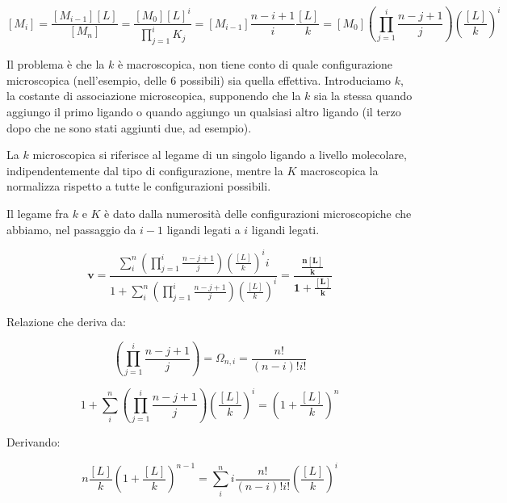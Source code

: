 \[\left\lbrack M_{i} \right\rbrack = \frac{\left\lbrack M_{i - 1} \right\rbrack\left\lbrack L \right\rbrack}{\left\lbrack M_{n} \right\rbrack} = \frac{\left\lbrack M_{0} \right\rbrack\left\lbrack L \right\rbrack^{i}}{\prod_{j = 1}^{i}K_{j}} = \left\lbrack M_{i - 1} \right\rbrack\frac{n - i + 1}{i}\frac{\left\lbrack L \right\rbrack}{k} = \left\lbrack M_{0} \right\rbrack\left( \prod_{j = 1}^{i}\frac{n - j + 1}{j} \right)\left( \frac{\left\lbrack L \right\rbrack}{k} \right)^{i}\ \]

Il problema è che la \(k\) è macroscopica, non tiene conto di quale
configurazione microscopica (nell'esempio, delle 6 possibili) sia quella
effettiva. Introduciamo \(k\), la costante di associazione microscopica,
supponendo che la \(k\) sia la stessa quando aggiungo il primo ligando o
quando aggiungo un qualsiasi altro ligando (il terzo dopo che ne sono
stati aggiunti due, ad esempio).

La \(k\) microscopica si riferisce al legame di un singolo ligando a
livello molecolare, indipendentemente dal tipo di configurazione, mentre
la \(K\) macroscopica la normalizza rispetto a tutte le configurazioni
possibili.

Il legame fra \(k\) e \(K\) è dato dalla numerosità delle configurazioni
microscopiche che abbiamo, nel passaggio da \(i - 1\) ligandi legati a
\(i\) ligandi legati.

\[\mathbf{v} = \frac{\sum_{i}^{n}{\left( \prod_{j = 1}^{i}\frac{n - j + 1}{j} \right)\left( \frac{\left\lbrack L \right\rbrack}{k} \right)^{i}i}}{1 + \sum_{i}^{n}{\left( \prod_{j = 1}^{i}\frac{n - j + 1}{j} \right)\left( \frac{\left\lbrack L \right\rbrack}{k} \right)^{i}}} = \frac{\frac{\mathbf{n}\left\lbrack \mathbf{L} \right\rbrack}{\mathbf{k}}}{\mathbf{1 +}\frac{\left\lbrack \mathbf{L} \right\rbrack}{\mathbf{k}}}\]

Relazione che deriva da:

\[\left( \prod_{j = 1}^{i}\frac{n - j + 1}{j} \right) = \Omega_{n,i} = \frac{n!}{\left( n - i \right)!i!}\]

\[1 + \sum_{i}^{n}{\left( \prod_{j = 1}^{i}\frac{n - j + 1}{j} \right)\left( \frac{\left\lbrack L \right\rbrack}{k} \right)^{i}} = \left( 1 + \frac{\left\lbrack L \right\rbrack}{k} \right)^{n}\]

Derivando:

\[n\frac{\left\lbrack L \right\rbrack}{k}\left( 1 + \frac{\left\lbrack L \right\rbrack}{k} \right)^{n - 1} = \sum_{i}^{n}{i\frac{n!}{\left( n - i \right)!i!}\left( \frac{\left\lbrack L \right\rbrack}{k} \right)^{i}}\]


